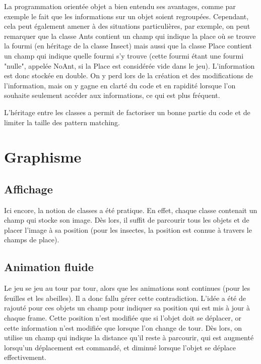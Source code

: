\documentclass[10pt,a4paper]{article}
\begin{document}
La programmation orientée objet a bien entendu ses avantages, comme par exemple le fait que les informations sur un objet soient regroupées. Cependant, cela peut également amener à des situations particulières, par exemple, on peut remarquer que la classe Ants contient un champ qui indique la place où se trouve la fourmi (en héritage de la classe Insect) mais aussi que la classe Place contient un champ qui indique quelle fourmi s'y trouve (cette fourmi étant une fourmi "nulle", appelée NoAnt, si la Place est considérée vide dans le jeu). L'information est donc stockée en double. On y perd lors de la création et des modifications de l'information, mais on y gagne en clarté du code et en rapidité lorsque l'on souhaite seulement accéder aux informations, ce qui est plus fréquent.

L'héritage entre les classes a permit de factoriser un bonne partie du code et de limiter la taille des pattern matching.

\section{Graphisme}

\subsection{Affichage}

Ici encore, la notion de classes a été pratique. En effet, chaque classe contenait un champ qui stocke son image. Dès lors, il suffit de parcourir tous les objets et de placer l'image à sa position (pour les insectes, la position est connue à travers le champs de place). 

\subsection{Animation fluide}
  
Le jeu se jeu au tour par tour, alors que les animations sont continues (pour les feuilles et les abeilles). Il a donc fallu gérer cette contradiction. L'idée a été de rajouté pour ces objets un champ pour indiquer sa position qui est mis à jour à chaque frame. Cette position n'est modifiée que si l'objet doit se déplacer, or cette information n'est modifiée que lorsque l'on change de tour. Dès lors, on utilise un champ qui indique la distance qu'il reste à parcourir, qui est augmenté lorsqu'un déplacement est commandé, et diminué lorsque l'objet se déplace effectivement.
\end{document}
